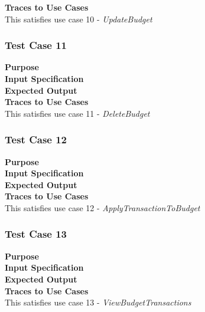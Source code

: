 \documentclass[12pt]{article}
\begin{document}
\noindent
{\bf Traces to Use Cases}\\
This satisfies use case 10 - \textit{UpdateBudget}

\clearpage %
\subsubsection{Test Case 11} \label{TC-11}
\noindent
{\bf Purpose}\\
                                                        
\noindent
{\bf Input Specification}\\

\noindent
{\bf Expected Output}\\

\noindent
{\bf Traces to Use Cases}\\
This satisfies use case 11 - \textit{DeleteBudget}

\subsubsection{Test Case 12} \label{TC-12}
\noindent
{\bf Purpose}\\
                                                        
\noindent
{\bf Input Specification}\\

\noindent
{\bf Expected Output}\\

\noindent
{\bf Traces to Use Cases}\\
This satisfies use case 12 - \textit{ApplyTransactionToBudget}

\clearpage %
\subsubsection{Test Case 13} \label{TC-13}
\noindent
{\bf Purpose}\\
                                                        
\noindent
{\bf Input Specification}\\

\noindent
{\bf Expected Output}\\

\noindent
{\bf Traces to Use Cases}\\
This satisfies use case 13 - \textit{ViewBudgetTransactions}
\end{document}
